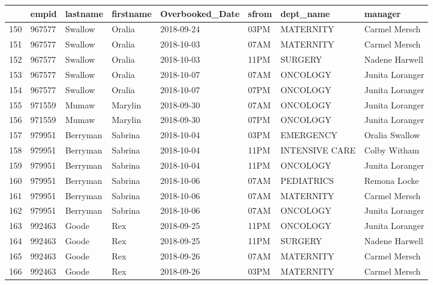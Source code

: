 \documentclass[11pt]{article}
\begin{document}
\begin{tabular}{|l|l|l|l|l|l|l|l|}
	\toprule
	{} &   empid &  lastname & firstname & Overbooked\_Date & sfrom &       dept\_name &          manager \\
	\midrule
	150 &  967577 &   Swallow &    Oralia &      2018-09-24 &  03PM &       MATERNITY &    Carmel Mersch \\
	151 &  967577 &   Swallow &    Oralia &      2018-10-03 &  07AM &       MATERNITY &    Carmel Mersch \\
	152 &  967577 &   Swallow &    Oralia &      2018-10-03 &  11PM &         SURGERY &   Nadene Harwell \\
	153 &  967577 &   Swallow &    Oralia &      2018-10-07 &  07AM &        ONCOLOGY &  Junita Loranger \\
	154 &  967577 &   Swallow &    Oralia &      2018-10-07 &  07PM &        ONCOLOGY &  Junita Loranger \\
	155 &  971559 &     Mumaw &   Marylin &      2018-09-30 &  07AM &        ONCOLOGY &  Junita Loranger \\
	156 &  971559 &     Mumaw &   Marylin &      2018-09-30 &  07PM &        ONCOLOGY &  Junita Loranger \\
	157 &  979951 &  Berryman &   Sabrina &      2018-10-04 &  03PM &       EMERGENCY &   Oralia Swallow \\
	158 &  979951 &  Berryman &   Sabrina &      2018-10-04 &  11PM &  INTENSIVE CARE &     Colby Witham \\
	159 &  979951 &  Berryman &   Sabrina &      2018-10-04 &  11PM &        ONCOLOGY &  Junita Loranger \\
	160 &  979951 &  Berryman &   Sabrina &      2018-10-06 &  07AM &      PEDIATRICS &     Remona Locke \\
	161 &  979951 &  Berryman &   Sabrina &      2018-10-06 &  07AM &       MATERNITY &    Carmel Mersch \\
	162 &  979951 &  Berryman &   Sabrina &      2018-10-06 &  07AM &        ONCOLOGY &  Junita Loranger \\
	163 &  992463 &     Goode &       Rex &      2018-09-25 &  11PM &        ONCOLOGY &  Junita Loranger \\
	164 &  992463 &     Goode &       Rex &      2018-09-25 &  11PM &         SURGERY &   Nadene Harwell \\
	165 &  992463 &     Goode &       Rex &      2018-09-26 &  07AM &       MATERNITY &    Carmel Mersch \\
	166 &  992463 &     Goode &       Rex &      2018-09-26 &  03PM &       MATERNITY &    Carmel Mersch \\

\end{tabular}
\end{document}
